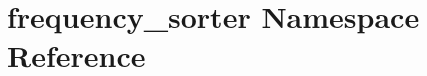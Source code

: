 \hypertarget{namespacefrequency__sorter}{\section{frequency\-\_\-sorter Namespace Reference}
\label{namespacefrequency__sorter}
}
